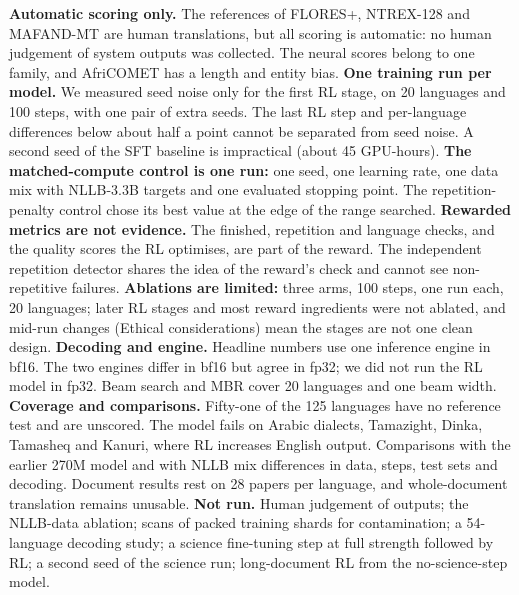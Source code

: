 \textbf{Automatic scoring only.} The references of FLORES+, NTREX-128 and MAFAND-MT are human translations, but all scoring is automatic: no human judgement of system outputs was collected. The neural scores belong to one family, and AfriCOMET has a length and entity bias.
\textbf{One training run per model.} We measured seed noise only for the first RL stage, on 20 languages and 100 steps, with one pair of extra seeds. The last RL step and per-language differences below about half a point cannot be separated from seed noise. A second seed of the SFT baseline is impractical (about 45 GPU-hours).
\textbf{The matched-compute control is one run:} one seed, one learning rate, one data mix with NLLB-3.3B targets and one evaluated stopping point. The repetition-penalty control chose its best value at the edge of the range searched.
\textbf{Rewarded metrics are not evidence.} The finished, repetition and language checks, and the quality scores the RL optimises, are part of the reward. The independent repetition detector shares the idea of the reward's check and cannot see non-repetitive failures.
\textbf{Ablations are limited:} three arms, 100 steps, one run each, 20 languages; later RL stages and most reward ingredients were not ablated, and mid-run changes (Ethical considerations) mean the stages are not one clean design.
\textbf{Decoding and engine.} Headline numbers use one inference engine in bf16. The two engines differ in bf16 but agree in fp32; we did not run the RL model in fp32. Beam search and MBR cover 20 languages and one beam width.
\textbf{Coverage and comparisons.} Fifty-one of the 125 languages have no reference test and are unscored. The model fails on Arabic dialects, Tamazight, Dinka, Tamasheq and Kanuri, where RL increases English output. Comparisons with the earlier 270M model and with NLLB mix differences in data, steps, test sets and decoding. Document results rest on 28 papers per language, and whole-document translation remains unusable.
\textbf{Not run.} Human judgement of outputs; the NLLB-data ablation; scans of packed training shards for contamination; a 54-language decoding study; a science fine-tuning step at full strength followed by RL; a second seed of the science run; long-document RL from the no-science-step model.
